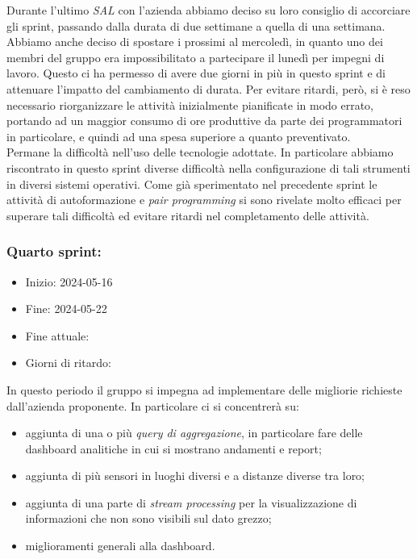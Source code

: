 Durante l'ultimo \textit{SAL} con l'azienda abbiamo deciso su loro consiglio di accorciare gli sprint, passando dalla durata di due settimane a quella di una settimana. Abbiamo anche deciso di spostare i prossimi al mercoledì, in quanto uno dei membri del gruppo era impossibilitato a partecipare il lunedì per impegni di lavoro. Questo ci ha permesso di avere due giorni in più in questo sprint e di attenuare l'impatto del cambiamento di durata. Per evitare ritardi, però, si è reso necessario riorganizzare le attività inizialmente pianificate in modo errato, portando ad un maggior consumo di ore produttive da parte dei programmatori in particolare, e quindi ad una spesa superiore a quanto preventivato. \\
Permane la difficoltà nell'uso delle tecnologie adottate. In particolare abbiamo riscontrato in questo sprint diverse difficoltà nella configurazione di tali strumenti in diversi sistemi operativi. Come già sperimentato nel precedente sprint le attività di autoformazione e \textit{pair programming} si sono rivelate molto efficaci per superare tali difficoltà ed evitare ritardi nel completamento delle attività.


\newpage
\subsubsection{Quarto sprint:}
\begin{itemize}
    \item Inizio: 2024-05-16
    \item Fine: 2024-05-22
    \item Fine attuale:
    \item Giorni di ritardo:
\end{itemize}

In questo periodo il gruppo si impegna ad implementare delle migliorie richieste dall'azienda proponente.
In particolare ci si concentrerà su:
\begin{itemize}
    \item aggiunta di una o più \textit{query di aggregazione}, in particolare fare delle dashboard analitiche in cui si
        mostrano andamenti e report;
    \item aggiunta di più sensori in luoghi diversi e a distanze diverse tra loro;
    \item aggiunta di una parte di \textit{stream processing} per la visualizzazione di informazioni che non sono
        visibili sul dato grezzo;
    \item miglioramenti generali alla dashboard.
\end{itemize}

